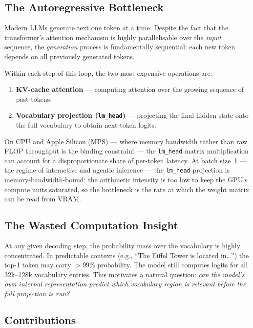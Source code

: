 \documentclass[twocolumn,10pt]{article}
\newcommand{\code}[1]{\texttt{#1}}
\begin{document}
\subsection{The Autoregressive Bottleneck}

Modern LLMs generate text one token at a time. Despite the fact that the
transformer's attention mechanism is highly parallelisable over the
\emph{input} sequence, the \emph{generation} process is fundamentally
sequential: each new token depends on all previously generated tokens.

Within each step of this loop, the two most expensive operations are:
\begin{enumerate}[leftmargin=*, itemsep=0pt, topsep=2pt]
  \item \textbf{KV-cache attention} --- computing attention over the growing
        sequence of past tokens.
  \item \textbf{Vocabulary projection (\code{lm\_head})} --- projecting the
        final hidden state onto the full vocabulary to obtain next-token
        logits.
\end{enumerate}

On CPU and Apple Silicon (MPS) --- where memory bandwidth rather than raw
FLOP throughput is the binding constraint --- the \code{lm\_head} matrix
multiplication can account for a disproportionate share of per-token latency.
At batch size~1 --- the regime of interactive and agentic inference --- the
\code{lm\_head} projection is memory-bandwidth-bound: the arithmetic intensity
is too low to keep the GPU's compute units saturated, so the bottleneck is the
rate at which the weight matrix can be read from VRAM.

\subsection{The Wasted Computation Insight}

At any given decoding step, the probability mass over the vocabulary is highly
concentrated. In predictable contexts (e.g., ``The Eiffel Tower is located
in\ldots'') the top-1 token may carry $>$99\% probability. The model still
computes logits for all 32k--128k vocabulary entries. This motivates a natural
question: \emph{can the model's own internal representation predict which
vocabulary region is relevant before the full projection is run?}

\subsection{Contributions}
\end{document}
